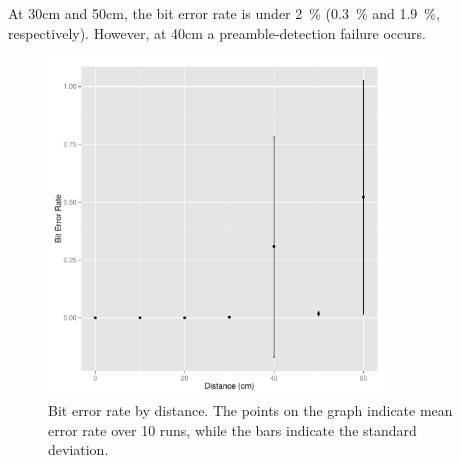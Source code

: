 \documentclass{article}
\begin{document}
At 30cm and 50cm, the bit error rate is under 2~\% (0.3~\% and 1.9~\%,
respectively). However, at 40cm a preamble-detection failure occurs.

\begin{figure}[h!]
  \label{fig:distance_results}
  \centering
  \includegraphics[width=0.8\textwidth]{figure.pdf}
  \caption{Bit error rate by distance. The points on the graph
    indicate mean error rate over 10 runs, while the bars indicate the
  standard deviation.}

\end{figure}
\end{document}
